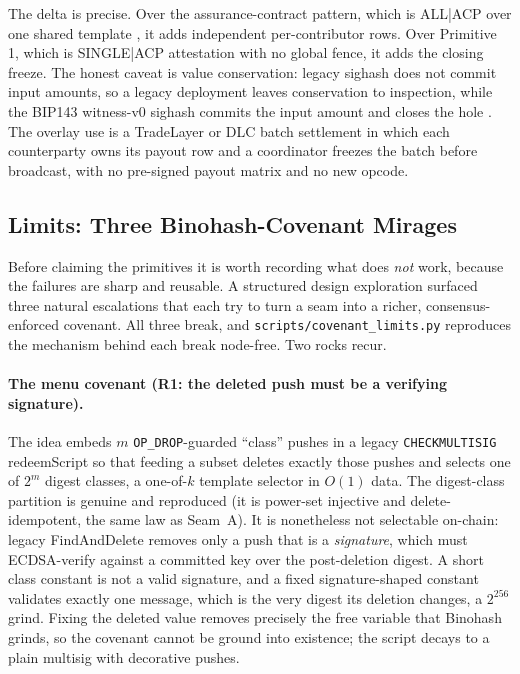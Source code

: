 \documentclass[11pt]{article}
\begin{document}
The delta is precise. Over the assurance-contract pattern, which is ALL|ACP over
one shared template \cite{bitcoinwiki_contracts}, it adds independent
per-contributor rows. Over Primitive 1, which is SINGLE|ACP attestation with no
global fence, it adds the closing freeze. The honest caveat is value
conservation: legacy sighash does not commit input amounts, so a legacy
deployment leaves conservation to inspection, while the BIP143 witness-v0 sighash
commits the input amount and closes the hole \cite{bip143}. The overlay use is a
TradeLayer or DLC batch settlement in which each counterparty owns its payout row
and a coordinator freezes the batch before broadcast, with no pre-signed payout
matrix and no new opcode.

\subsection{Limits: Three Binohash-Covenant Mirages}
\label{sec:limits}

Before claiming the primitives it is worth recording what does \emph{not} work,
because the failures are sharp and reusable. A structured design exploration
surfaced three natural escalations that each try to turn a seam into a richer,
consensus-enforced covenant. All three break, and
\texttt{scripts/covenant\_limits.py} reproduces the mechanism behind each break
node-free. Two rocks recur.

\paragraph{The menu covenant (R1: the deleted push must be a verifying
signature).} The idea embeds $m$ \texttt{OP\_DROP}-guarded ``class'' pushes in a
legacy \texttt{CHECKMULTISIG} redeemScript so that feeding a subset deletes
exactly those pushes and selects one of $2^m$ digest classes, a one-of-$k$
template selector in $O(1)$ data. The digest-class partition is genuine and
reproduced (it is power-set injective and delete-idempotent, the same law as
Seam~A). It is nonetheless not selectable on-chain: legacy FindAndDelete removes
only a push that is a \emph{signature}, which must ECDSA-verify against a
committed key over the post-deletion digest. A short class constant is not a
valid signature, and a fixed signature-shaped constant validates exactly one
message, which is the very digest its deletion changes, a $2^{256}$ grind.
Fixing the deleted value removes precisely the free variable that Binohash
grinds, so the covenant cannot be ground into existence; the script decays to a
plain multisig with decorative pushes.
\end{document}

